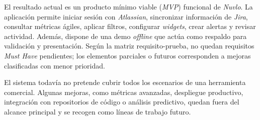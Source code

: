 El resultado actual es un producto mínimo viable (\textit{MVP}) funcional de \textit{Nuvlo}. La aplicación permite iniciar sesión con \textit{Atlassian}, sincronizar información de \textit{Jira}, consultar métricas ágiles, aplicar filtros, configurar \textit{widgets}, crear alertas y revisar actividad. Además, dispone de una demo \textit{offline} que actúa como respaldo para validación y presentación. Según la matriz requisito-prueba, no quedan requisitos \textit{Must Have} pendientes; los elementos parciales o futuros corresponden a mejoras clasificadas con menor prioridad.

El sistema todavía no pretende cubrir todos los escenarios de una herramienta comercial. Algunas mejoras, como métricas avanzadas, despliegue productivo, integración con repositorios de código o análisis predictivo, quedan fuera del alcance principal y se recogen como líneas de trabajo futuro.

